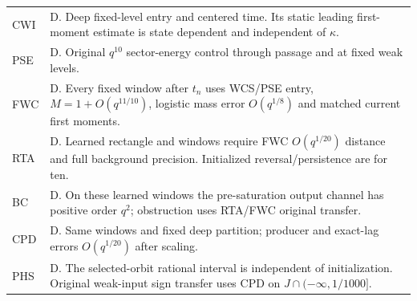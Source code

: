 \documentclass[11pt]{article}
\begin{document}
\begin{longtable}{@{}p{}p{}@{}}
CWI & D. Deep fixed-level entry and centered time. Its static leading first-moment estimate is state dependent and independent of \(\kappa\).\\
PSE & D. Original \(q^{10}\) sector-energy control through passage and at fixed weak levels.\\
FWC & D. Every fixed window after \(t_n\) uses WCS/PSE entry, \(M=1+O(q^{11/10})\), logistic mass error \(O(q^{1/8})\) and matched current first moments.\\
RTA & D. Learned rectangle and windows require FWC \(O(q^{1/20})\) distance and full background precision. Initialized reversal/persistence are for ten.\\
BC & D. On these learned windows the pre-saturation output channel has positive order \(q^2\); obstruction uses RTA/FWC original transfer.\\
CPD & D. Same windows and fixed deep partition; producer and exact-lag errors \(O(q^{1/20})\) after scaling.\\
PHS & D. The selected-orbit rational interval is independent of initialization. Original weak-input sign transfer uses CPD on \(J\cap(-\infty,1/1000]\).\\
\bottomrule\end{longtable}\normalsize
\end{document}
